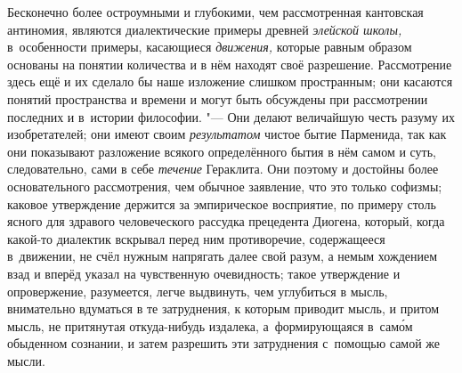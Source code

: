 Бесконечно более остроумными и глубокими, чем рассмотренная кантовская
антиномия, являются диалектические примеры древней {\em элейской школы,}
в~особенности примеры, касающиеся {\em движения,} которые равным образом основаны
на понятии количества и в нём находят своё разрешение. Рассмотрение здесь
ещё и их сделало бы наше изложение слишком пространным; они касаются понятий
пространства и времени и могут быть обсуждены при рассмотрении последних и
в~истории философии. "--- Они делают величайшую честь разуму их изобретателей;
они имеют своим {\em результатом} чистое бытие Парменида, так как они
показывают разложение всякого определённого бытия в нём самом и суть,
следовательно, сами в себе {\em течение} Гераклита. Они поэтому и достойны
более основательного рассмотрения, чем обычное заявление, что это только
софизмы; каковое утверждение держится за эмпирическое восприятие, по примеру
столь ясного для здравого человеческого рассудка прецедента Диогена, который,
когда какой-то диалектик вскрывал перед ним противоречие, содержащееся
в~движении, не счёл нужным напрягать далее свой разум, а немым хождением взад
и вперёд указал на чувственную очевидность; такое утверждение и опровержение,
разумеется, легче выдвинуть, чем углубиться в мысль, внимательно вдуматься
в те затруднения, к которым приводит мысль, и притом мысль, не притянутая
откуда-нибудь издалека, а~формирующаяся в~сам\'{о}м обыденном сознании,
и затем разрешить эти затруднения с~помощью самой же мысли.

